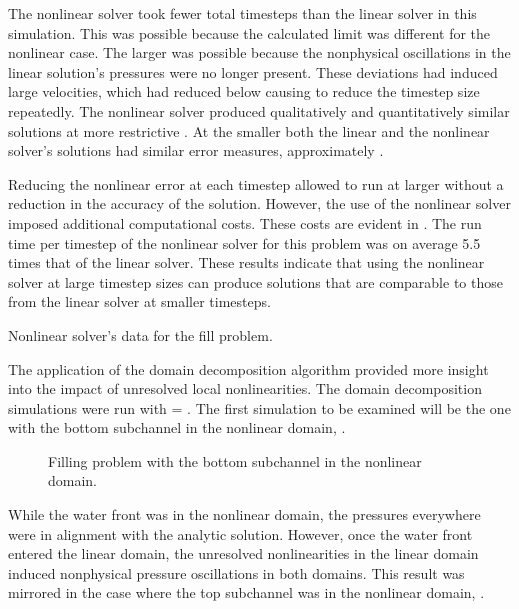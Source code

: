 The nonlinear solver took fewer total timesteps than the linear solver in this simulation.
This was possible because the calculated \dtcrnt{} limit was different for the nonlinear case.
The larger \dtcrnt{} was possible because the nonphysical oscillations in the linear solution's pressures were no longer present.
These deviations had induced large velocities, which had reduced \dtcrnt{} below \dtmax{} causing \cobra{} to reduce the timestep size repeatedly.
The nonlinear solver produced qualitatively and quantitatively similar solutions at more restrictive \dtmax{}.
At the smaller \dtmax{} both the linear and the nonlinear solver's solutions had similar error measures, approximately .

Reducing the nonlinear error at each timestep allowed \cobra{} to run at larger \dt{} without a reduction in the accuracy of the solution.
However, the use of the nonlinear solver imposed additional computational costs.
These costs are evident in .
The run time per timestep of the nonlinear solver for this problem was on average 5.5 times that of the linear solver.
These results indicate that using the nonlinear solver at large timestep sizes can produce solutions that are comparable to those from the linear solver at smaller timesteps.

\begin{table}[h!tb]
\centering
\singlespace

\caption{Nonlinear solver's data for the fill problem.}
\label{tab:vmpNlnRunTime}
\end{table}

The application of the domain decomposition algorithm provided more insight into the impact of unresolved local nonlinearities.
The domain decomposition simulations were run with \dtmax{} = .
The first simulation to be examined will be the one with the bottom subchannel in the nonlinear domain, .

\begin{figure}[h!tb]
\centering

\caption{Filling problem with the bottom subchannel in the nonlinear domain.}
\label{fig:vmpDDBotChan}
\end{figure}

While the water front was in the nonlinear domain, the pressures everywhere were in alignment with the analytic solution.
However, once the water front entered the linear domain, the unresolved nonlinearities in the linear domain induced nonphysical pressure oscillations in both domains.
This result was mirrored in the case where the top subchannel was in the nonlinear domain, .


